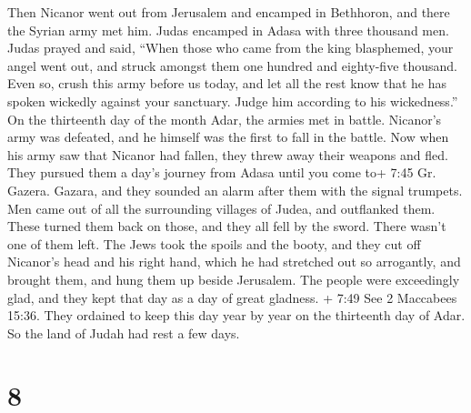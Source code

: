 Then Nicanor went out from Jerusalem and encamped in
Bethhoron, and there the Syrian army met him.  Judas
encamped in Adasa with three thousand men. Judas prayed and said,
 ``When those who came from the king blasphemed, your angel
went out, and struck amongst them one hundred and eighty-five thousand.
 Even so, crush this army before us today, and let all the
rest know that he has spoken wickedly against your sanctuary. Judge him
according to his wickedness.''  On the thirteenth day of
the month Adar, the armies met in battle. Nicanor's army was defeated,
and he himself was the first to fall in the battle.  Now
when his army saw that Nicanor had fallen, they threw away their weapons
and fled.  They pursued them a day's journey from Adasa
until you come to+ 7:45 Gr. Gazera. Gazara, and they sounded an alarm
after them with the signal trumpets.  Men came out of all
the surrounding villages of Judea, and outflanked them. These turned
them back on those, and they all fell by the sword. There wasn't one of
them left.  The Jews took the spoils and the booty, and
they cut off Nicanor's head and his right hand, which he had stretched
out so arrogantly, and brought them, and hung them up beside Jerusalem.
 The people were exceedingly glad, and they kept that day
as a day of great gladness.  + 7:49 See 2 Maccabees 15:36.
They ordained to keep this day year by year on the thirteenth day of
Adar.  So the land of Judah had rest a few days.

\hypertarget{section-7}{%
\section{8}\label{section-7}}

